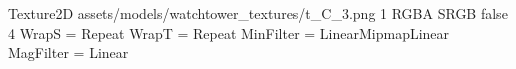 Texture2D
assets/models/watchtower_textures/t_C_3.png
1
RGBA
SRGB
false
4
WrapS = Repeat
WrapT = Repeat
MinFilter = LinearMipmapLinear
MagFilter = Linear
